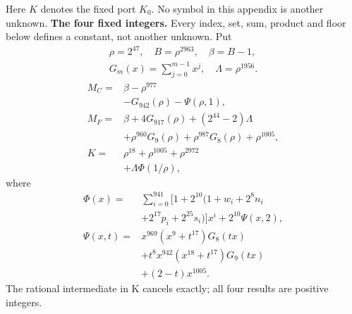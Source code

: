\begingroup
\providecommand{\fl}[1]{\left\lfloor#1\right\rfloor}
\providecommand{\rg}[2]{\{#1,\ldots,#2\}}
Here $K$ denotes the fixed port $K_0$. No symbol in this appendix is another unknown.
\textbf{The four fixed integers.}
Every index, set, sum, product and floor below defines a constant, not
another unknown. Put
\[
\begin{gathered}
\rho=2^{47},\quad B=\rho^{2963},\quad\beta=B-1,\\
G_m(x)=\sum_{j=0}^{m-1}x^j,\quad
\Lambda=\rho^{1956}.
\end{gathered}
\]
\begin{align*}
M_C={}&\beta-\rho^{977}\\
&-G_{942}(\rho)-\Psi(\rho,1),\\
M_F={}&\beta+4G_{917}(\rho)+(2^{44}-2)\Lambda\\
&+\rho^{960}G_9(\rho)+\rho^{987}G_8(\rho)
  +\rho^{1005},\\
K={}&\rho^{18}+\rho^{1005}+\rho^{2972}\\
&+\Lambda\Phi(1/\rho),
\end{align*}
where
\[
\begin{split}
\Phi(x)={}&\sum_{i=0}^{941}[1+2^{10}(1+w_i+2^8n_i\\
&+2^{17}p_i+2^{25}s_i)]x^i+2^{10}\Psi(x,2),\\
\Psi(x,t)={}&x^{969}(x^9+t^{17})G_8(tx)\\
&+t^8x^{942}(x^{18}+t^{17})G_9(tx)\\
&+(2-t)x^{1005}.
\end{split}
\]
The rational intermediate in K cancels exactly; all four results are positive integers.

